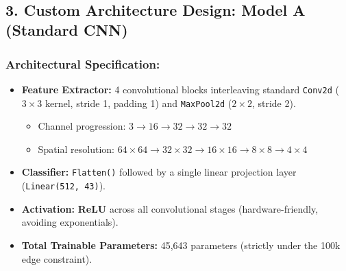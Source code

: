\documentclass[11pt]{article}
\providecommand{\tightlist}{%
      \setlength{\itemsep}{0pt}\setlength{\parskip}{0pt}}
\begin{document}
    \begin{center}
    \end{center}
    { \hspace*{\fill} \\}
    
    \subsection{3. Custom Architecture Design: Model A (Standard
CNN)}\label{custom-architecture-design-model-a-standard-cnn}

\subsubsection{Architectural
Specification:}\label{architectural-specification}

\begin{itemize}
\tightlist
\item
  \textbf{Feature Extractor:} 4 convolutional blocks interleaving
  standard \texttt{Conv2d} (\(3 \times 3\) kernel, stride 1, padding 1)
  and \texttt{MaxPool2d} (\(2 \times 2\), stride 2).

  \begin{itemize}
  \tightlist
  \item
    Channel progression:
    \(3 \rightarrow 16 \rightarrow 32 \rightarrow 32 \rightarrow 32\)
  \item
    Spatial resolution:
    \(64 \times 64 \rightarrow 32 \times 32 \rightarrow 16 \times 16 \rightarrow 8 \times 8 \rightarrow 4 \times 4\)
  \end{itemize}
\item
  \textbf{Classifier:} \texttt{Flatten()} followed by a single linear
  projection layer (\texttt{Linear(512,\ 43)}).
\item
  \textbf{Activation:} \textbf{ReLU} across all convolutional stages
  (hardware-friendly, avoiding exponentials).
\item
  \textbf{Total Trainable Parameters:} 45,643 parameters (strictly under
  the 100k edge constraint).
\end{itemize}
\end{document}
